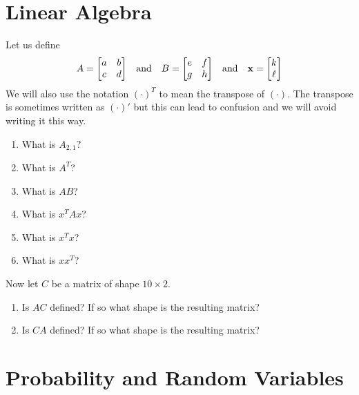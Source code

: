 \documentclass[paper=letter, fontsize=11pt]{scrartcl}
\numberwithin{equation}{section}
\numberwithin{figure}{section}
\numberwithin{table}{section}
\begin{document}
\section{Linear Algebra}

Let us define
\begin{equation}
  A = \mqty[a & b \\ c & d] \qqtext{and} B= \mqty[e & f \\ g & h] \qqtext{and} \vb{x}=\mqty[k\\ \ell]
\end{equation}
We will also use the notation $(\cdot)^T$ to mean the transpose of $(\cdot)$.
The transpose is sometimes written as $(\cdot)'$ but this can lead to confusion and we will avoid writing it this way.
\begin{enumerate}
  \item What is $A_{2, 1}$?
  \item What is $A^T$?
  \item What is $AB$?
  \item What is $x^T A x$?
  \item What is $x^T x$?
  \item What is $x x^T$?
\end{enumerate}
Now let $C$ be a matrix of shape $10 \times 2$.
\begin{enumerate}[resume]
  \item Is $AC$ defined? If so what shape is the resulting matrix?
  \item Is $CA$ defined? If so what shape is the resulting matrix?
\end{enumerate}

\section{Probability and Random Variables}
\end{document}
